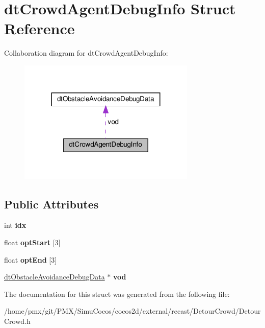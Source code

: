 \hypertarget{structdtCrowdAgentDebugInfo}{}\section{dt\+Crowd\+Agent\+Debug\+Info Struct Reference}
\label{structdtCrowdAgentDebugInfo}


Collaboration diagram for dt\+Crowd\+Agent\+Debug\+Info\+:
\nopagebreak
\begin{figure}[H]
\begin{center}
\leavevmode
\includegraphics[width=239pt]{structdtCrowdAgentDebugInfo__coll__graph}
\end{center}
\end{figure}
\subsection*{Public Attributes}
\begin{DoxyCompactItemize}
\item 
\mbox{\label{structdtCrowdAgentDebugInfo_ac0c1fb2edc72e4e688eb943d8f2d92b2}} 
int {\bfseries idx}
\item 
\mbox{\label{structdtCrowdAgentDebugInfo_a113586a53e823f593d7b8e9b1f1a8164}} 
float {\bfseries opt\+Start} \mbox{[}3\mbox{]}
\item 
\mbox{\label{structdtCrowdAgentDebugInfo_a28f68f3653e40627822acdedb2270a56}} 
float {\bfseries opt\+End} \mbox{[}3\mbox{]}
\item 
\mbox{\label{structdtCrowdAgentDebugInfo_a6ecd78537b5a43dec31c526ea60f4a2a}} 
\hyperlink{classdtObstacleAvoidanceDebugData}{dt\+Obstacle\+Avoidance\+Debug\+Data} $\ast$ {\bfseries vod}
\end{DoxyCompactItemize}


The documentation for this struct was generated from the following file\+:\begin{DoxyCompactItemize}
\item 
/home/pmx/git/\+P\+M\+X/\+Simu\+Cocos/cocos2d/external/recast/\+Detour\+Crowd/Detour\+Crowd.\+h\end{DoxyCompactItemize}
